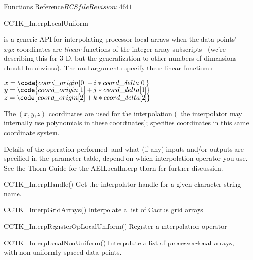 \begin{cactuspart}{ Functions Reference}{$RCSfile$}{$Revision: 4641 $}
\begin{FunctionDescription}{CCTK\_InterpLocalUniform}
\begin{Discussion}
 is a generic API for interpolating
processor-local arrays when the data points'~$xyz$ coordinates are
{\em linear\/} functions of the integer array subscripts~
(we're describing this for 3-D, but the generalization to other numbers
of dimensions should be obvious).  The  and
 arguments specify these linear functions:
\begin{flushleft}
$x = \code{coord\_origin[0] + i*coord\_delta[0]}$ \\
$y = \code{coord\_origin[1] + j*coord\_delta[1]}$ \\
$z = \code{coord\_origin[2] + k*coord\_delta[2]}$ %
\end{flushleft}
The $(x,y,z)$ coordinates are used for the interpolation
(\ie{}~the interpolator may internally use polynomials in these
coordinates);  specifies coordinates in this
same coordinate system.

Details of the operation performed, and what (if any) inputs and/or
outputs are specified in the parameter table, depend on which interpolation
operator you use.  See the Thorn Guide for the AEILocalInterp thorn for
further discussion.
\end{Discussion}

\begin{SeeAlsoSection}
\begin{SeeAlso}{CCTK\_InterpHandle()}
Get the interpolator handle for a given character-string name.
\end{SeeAlso}
\begin{SeeAlso}{CCTK\_InterpGridArrays()}
Interpolate a list of Cactus grid arrays
\end{SeeAlso}
\begin{SeeAlso}{CCTK\_InterpRegisterOpLocalUniform()}
\hbox{}
Register a  interpolation operator
\end{SeeAlso}
\begin{SeeAlso}{CCTK\_InterpLocalNonUniform()}
Interpolate a list of processor-local arrays,
with non-uniformly spaced data points.
\end{SeeAlso}
\end{SeeAlsoSection}


\end{FunctionDescription}
\end{cactuspart}
